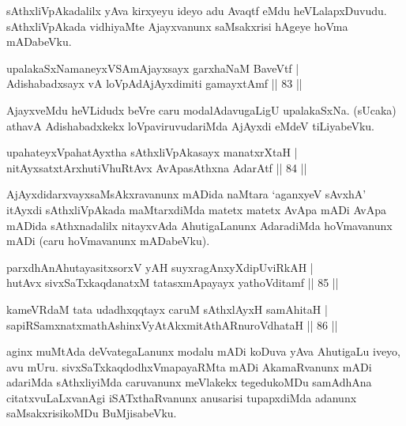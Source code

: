 \begin{artha}
sAthxliVpAkadalilx yAva kirxyeyu ideyo adu Avaqtf eMdu 
heVLalapxDu\-vudu. sAthxliVpAkada vidhiyaMte Ajayxvanunx saMsakxrisi 
hAgeye hoVma mADabeVku.
\end{artha}

\begin{shl}
upalakaSxNamaneyxVSAmAjayxsayx garxhaNaM BaveVtf | \\
Adishabadxsayx vA loVpAdAjAyxdimiti gamayxtAmf \hfill|| 83 || 
\end{shl}

\begin{artha}
AjayxveMdu heVLidudx beVre caru modalAdavugaLigU upalakaSxNa. (sUcaka) 
athavA Adishabadxkekx loVpaviruvudariMda AjAyxdi eMdeV tiLiyabeVku.
\end{artha}


\begin{shl}
upahateyxVpahatAyxtha sAthxliVpAkasayx manatxrXtaH | \\
nitAyxsatxtArx\s \s hutiVhuRtAvx AvApasAthxna AdarAtf \hfill|| 84 || 
\end{shl}

\begin{artha}
AjAyxdidarxvayxsaMsAkxravanunx mADida naMtara `aganxyeV sAvxhA' 
itAyxdi sAthxliVpAkada maMtarxdiMda matetx matetx AvApa mADi AvApa 
mADida sAthxnadalilx nitayxvAda AhutigaLanunx AdaradiMda hoVmavanunx 
mADi (caru hoVmavanunx mADabeVku).
\end{artha}


\begin{shl}
parxdhAnAhutayasitxsorxV yAH suyxragAnxyXdipUviRkAH | \\
hutAvx sivxSaTxkaqdanatxM tatasxmApayayx yathoVditamf \hfill|| 85 || 
\end{shl}

\begin{shl}
kameVRdaM tata udadhxqqtayx caruM sAthxlAyxH samAhitaH | \\
sapiRSamxnatxmathAshinxVyAtAkxmitAthARnuroVdhataH \hfill|| 86 || 
\end{shl}

\begin{artha}
aginx muMtAda deVvategaLanunx modalu mADi koDuva yAva AhutigaLu iveyo, 
avu mUru. sivxSaTxkaqdodhxVmapayaRMta mADi AkamaRvanunx mADi 
adariMda sAthxliyiMda caruvanunx meVlakekx tegedukoMDu samAdhAna 
citatxvuLaLxvanAgi iSATxthaRvanunx anusarisi tupapxdiMda adanunx 
saMsakxrisikoMDu BuMjisabeVku.
\end{artha}

